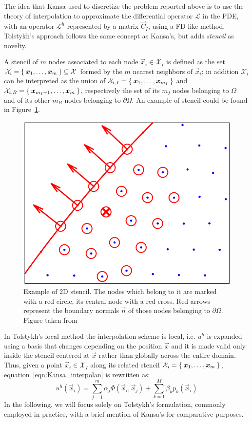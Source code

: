 The idea that Kansa used to discretize the problem reported above is to use the theory of interpolation to approximate the differential operator $\mathcal{L}$ in the PDE, with an operator $\mathcal{L}^h$ represented by a matrix $\vec{C}_I$, using a FD-like method.
Tolstykh's approach follows the same concept as Kansa's, but adds \emph{stencil} as novelty.

A stencil of $m$ nodes associated to each node $\vec{x}_i \in \mathcal{X}_I$ is defined as the set $\mathcal{X}_i = \Set{\boldsymbol{x}_1, \dots, \boldsymbol{x}_m} \subseteq \mathcal{X}$ formed by the $m$ nearest neighbors of $\vec{x}_i$; in addition $\mathcal{X}_i$ can be interpreted as the union of $\mathcal{X}_{i,I} = \Set{\boldsymbol{x}_1, \dots, \boldsymbol{x}_{m_I}}$ and $\mathcal{X}_{i,B} = \Set{\boldsymbol{x}_{m_I+1}, \dots, \boldsymbol{x}_m}$, respectively the set of its $m_I$ nodes belonging to $\Omega$ and of its other $m_B$ nodes belonging to $\partial\Omega$. An example of stencil could be found in Figure~\ref{fig:2D_stencil}.

\begin{figure}
\centering
\includegraphics[width=.5\textwidth]{img/2D_stencil}
\caption{Example of $2$D stencil. The nodes which belong to it are marked with a red circle, its central node with a red cross. Red arrows represent the boundary normals $\vec{n}$ of those nodes belonging to $\partial\Omega$. Figure taken from~\cite{Miotti:phd_thesis}} 
\label{fig:2D_stencil}
\end{figure}

In Tolstykh's local method the interpolation scheme is local, i.e. $u^h$ is expanded using a basis that changes depending on the position $\vec{x}$ and it is made valid only inside the stencil centered at $\vec{x}$ rather than globally across the entire domain. Thus, given a point $\vec{x}_i \in \mathcal{X}_I$ along its related stencil $\mathcal{X}_i = \Set{\boldsymbol{x}_1, \dots, \boldsymbol{x}_m}$, equation~\eqref{eqn:Kansa_interpolan} is rewritten as:
\begin{equation}
	\label{eqn:local_RBF-FD_interpolant}
	u^h(\vec{x}_i) = \sum_{j=1}^{m} \alpha_j \Phi(\vec{x}_i, \vec{x}_j) + \sum_{k=1}^{M} \beta_k p_k(\vec{x}_i)
\end{equation}
In the following, we will focus solely on Tolstykh’s formulation, commonly employed in practice, with a brief mention of Kansa's for comparative purposes.

